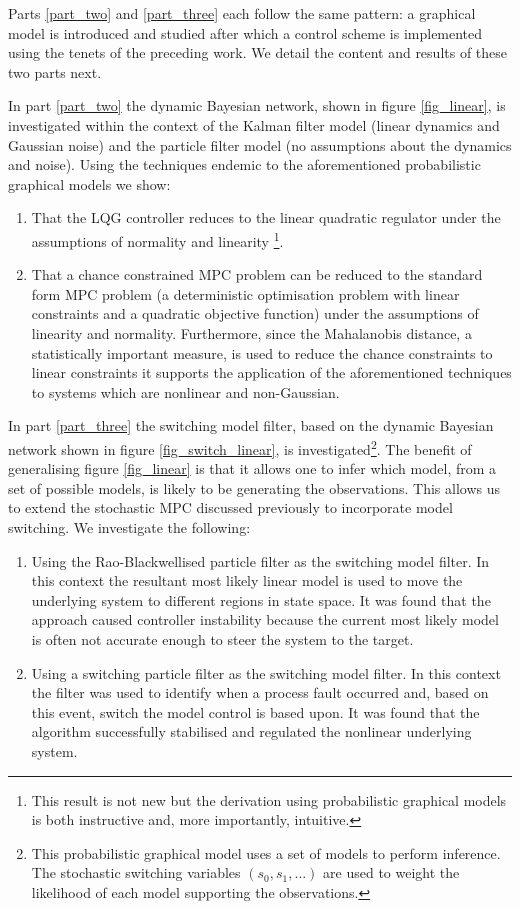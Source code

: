 Parts \ref{part_two} and \ref{part_three} each follow the same pattern: a graphical model is introduced and studied after which a control scheme is implemented using the tenets of the preceding work. We detail the content and results of these two parts next.

In part \ref{part_two} the dynamic Bayesian network, shown in figure \ref{fig_linear}, is investigated within the context of the Kalman filter model (linear dynamics and Gaussian noise) and the particle filter model (no assumptions about the dynamics and noise). Using the techniques endemic to the aforementioned probabilistic graphical models we show:
\begin{enumerate}
\item
That the LQG controller reduces to the linear quadratic regulator under the assumptions of normality and linearity \footnote{This result is not new but the derivation using probabilistic graphical models is both instructive and, more importantly, intuitive.}.
\item
That a chance constrained MPC problem can be reduced to the standard form MPC problem (a deterministic optimisation problem with linear constraints and a quadratic objective function) under the assumptions of linearity and normality. Furthermore, since the Mahalanobis distance, a statistically important measure, is used to reduce the chance constraints to linear constraints it supports the application of the aforementioned techniques to systems which are nonlinear and non-Gaussian. 
\end{enumerate}
In part \ref{part_three} the switching model filter, based on the dynamic Bayesian network shown in figure \ref{fig_switch_linear}, is investigated\footnote{This probabilistic graphical model uses a set of models to perform inference. The stochastic switching variables $(s_0, s_1,...)$ are used to weight the likelihood of each model supporting the observations.}. The benefit of generalising figure \ref{fig_linear} is that it allows one to infer which model, from a set of possible models, is likely to be generating the observations. This allows us to extend the stochastic MPC discussed previously to incorporate model switching. We investigate the following:
\begin{enumerate}
\item
Using the Rao-Blackwellised particle filter as the switching model filter. In this context the resultant most likely linear model is used to move the underlying system to different regions in state space. It was found that the approach caused controller instability because the current most likely model is often not accurate enough to steer the system to the target.
\item
Using a switching particle filter as the switching model filter. In this context the filter was used to identify when a process fault occurred and, based on this event, switch the model control is based upon. It was found that the algorithm successfully stabilised and regulated the nonlinear underlying system.
\end{enumerate}
